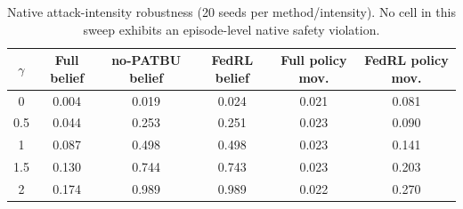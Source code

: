 \begin{table}[t]
\centering
\caption{Native attack-intensity robustness (20 seeds per method/intensity). No cell in this sweep exhibits an episode-level native safety violation.}
\label{tab:e1-intensity}
\scriptsize
\setlength{\tabcolsep}{5pt}
\begin{tabular}{@{}cccccc@{}}
\toprule
$\gamma$ & Full belief & no-PATBU belief & FedRL belief & Full policy mov. & FedRL policy mov.\\
\midrule
0 & 0.004 & 0.019 & 0.024 & 0.021 & 0.081\\
0.5 & 0.044 & 0.253 & 0.251 & 0.023 & 0.090\\
1 & 0.087 & 0.498 & 0.498 & 0.023 & 0.141\\
1.5 & 0.130 & 0.744 & 0.743 & 0.023 & 0.203\\
2 & 0.174 & 0.989 & 0.989 & 0.022 & 0.270\\
\bottomrule
\end{tabular}
\end{table}
